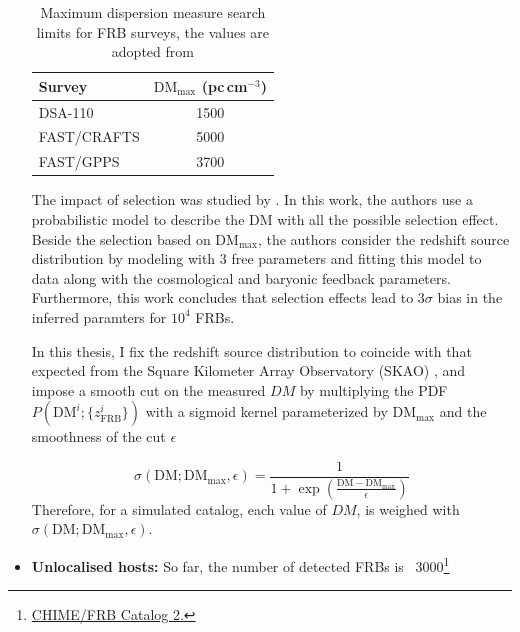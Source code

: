 \begin{itemize}
\begin{table}[h!]
    \centering
    \begin{tabular}{lc}
        \hline
        Survey & $\mathrm{DM}_{\mathrm{max}}$ (pc\,cm$^{-3}$) \\
        \hline
        DSA-110        & 1500               \\
        FAST/CRAFTS    & 5000               \\
        FAST/GPPS      & 3700               \\
        \hline
    \end{tabular}
    \caption{Maximum dispersion measure search limits for FRB surveys, the values are adopted from \citet{hoffmann2025modelling}}

    \label{tab:dmmax}
\end{table}

The impact of selection was studied by \citet{sharma2026quantifying}. In this work, the authors use a probabilistic model to describe the DM with all the possible selection effect. Beside the selection based on $\mathrm{DM}_\mathrm{\max}$, the authors consider the redshift source distribution by modeling with 3 free parameters and fitting this model to data along with the cosmological and baryonic feedback parameters. Furthermore, this work concludes that selection effects lead to $3\sigma$ bias in the inferred paramters for $10^4$ FRBs.

In this thesis, I fix the redshift source distribution to coincide with that expected from the Square Kilometer Array Observatory (SKAO) \citep{braun2015advancing}, and impose a smooth cut on the measured $DM$ by multiplying the PDF $P(\mathrm{DM}^i ; \{z_\mathrm{FRB}^i\})$ with a sigmoid kernel \citep{shannon2018dispersion} parameterized by $\mathrm{DM}_\mathrm{\max}$ and the smoothness of the cut $\epsilon$

\begin{equation}
    \sigma (\mathrm{DM}; \mathrm{DM}_\mathrm{max}, \epsilon) = \frac{1}{1 + \exp\left(\frac{\mathrm{DM} - \mathrm{DM}_\mathrm{max}}{\epsilon}\right)}
\end{equation}
Therefore, for a simulated catalog, each value of $DM$, is weighed with $\sigma (\mathrm{DM}; \mathrm{DM}_\mathrm{max}, \epsilon)$. 

\item \textbf{Unlocalised hosts:} So far, the number of detected FRBs is ~3000\footnote{\href{https://www.chime-frb.ca/catalog2}{CHIME/FRB Catalog 2.}

}
\end{itemize}
